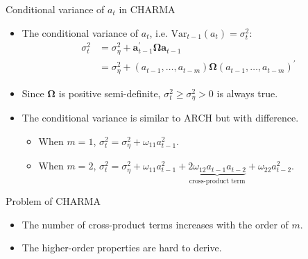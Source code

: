 \documentclass[presentation,10pt]{beamer}
\newcommand{\var}{\mathrm{Var}}
\begin{document}
\begin{frame}[label={sec:org7e1926a}]{Conditional variance of \(a_t\) in CHARMA}
\begin{itemize}
\item The conditional variance of \(a_t\), i.e. \(\var_{t-1}(a_t) = \sigma^2_t\):
\begin{equation*}
\begin{split}
  \sigma^2_t &= \sigma^2_{\eta} + \mathbf{a}_{t-1}^{\prime} \boldsymbol{\Omega} \mathbf{a}_{t-1} \\
             &= \sigma^2_{\eta} + (a_{t-1}, \ldots, a_{t-m})\boldsymbol{\Omega} (a_{t-1}, \ldots, a_{t-m})^{\prime}
\end{split}
\end{equation*}
\end{itemize}

\vspace{0.1cm}

\begin{itemize}
\item Since \(\boldsymbol{\Omega}\) is positive semi-definite, \(\sigma^2_t
  \geq \sigma^2_{\eta} > 0\) is always true.
\end{itemize}

\vspace{0.1cm}

\begin{itemize}
\item The conditional variance is similar to ARCH but with difference.

\begin{itemize}
\item When \(m = 1\), \(\sigma^2_t = \sigma^2_{\eta} + \omega_{11} a_{t-1}^2\).

\item When \(m =2\), \(\sigma^2_t = \sigma^2_{\eta} + \omega_{11} a_{t-1}^2 +
    \underbrace{2\omega_{12} a_{t-1} a_{t-2}}_{\text{cross-product term}} + \omega_{22} a^2_{t-2}\).
\end{itemize}
\end{itemize}
\end{frame}

\begin{frame}[label={sec:org09ff7b6}]{Problem of CHARMA}
\begin{itemize}
\item The number of cross-product terms increases with the order of \(m\).
\end{itemize}

\vspace{0.1cm}

\begin{itemize}
\item The higher-order properties are hard to derive.
\end{itemize}
\end{frame}
\end{document}
